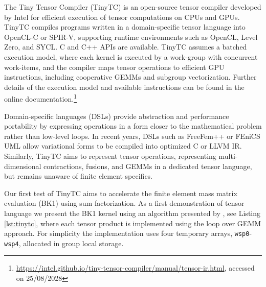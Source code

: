 \documentclass[a4paper,12pt]{article}
\begin{document}
\label{sec:tinytc}

The Tiny Tensor Compiler (TinyTC) is an open-source tensor compiler developed by Intel for efficient execution of tensor computations on CPUs and GPUs. TinyTC compiles programs written in a domain-specific tensor language into OpenCL-C or SPIR-V, supporting runtime environments such as OpenCL, Level Zero, and SYCL. C and C++ APIs are available. TinyTC assumes a batched execution model, where each kernel is executed by a work-group with concurrent work-items, and the compiler maps tensor operations to efficient GPU instructions, including cooperative GEMMs and subgroup vectorization. Further details of the execution model and available instructions can be found in the online documentation.\footnote{\url{https://intel.github.io/tiny-tensor-compiler/manual/tensor-ir.html}, accessed on 25/08/2028}

Domain-specific languages (DSLs) provide abstraction and performance portability by expressing operations in a form closer to the mathematical problem rather than low-level loops. In recent years, DSLs such as FreeFem++ or FEniCS UML allow variational forms to be compiled into optimized C or LLVM IR. Similarly, TinyTC aims to represent tensor operations, representing multi-dimensional contractions, fusions, and GEMMs in a dedicated tensor language, but remains unaware of finite element specifics.

Our first test of TinyTC aims to accelerate the finite element mass matrix evaluation (BK1) using sum factorization. As a first demonstration of tensor language we present the BK1 kernel using an algorithm presented by \cite{Swirydowicz19}, see Listing \ref{lst:tinytc}, where each tensor product is implemented using the loop over GEMM approach. For simplicity the implementation uses four temporary arrays, \texttt{wsp0}-\texttt{wsp4}, allocated in group local storage.
\end{document}

